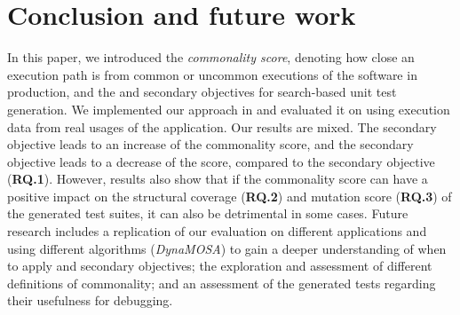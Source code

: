 

\section{Conclusion and future work}
\label{sec:cub:conclusion}

In this paper, we introduced the \emph{commonality score}, denoting how close an execution path is from common or uncommon executions of the software in production, and the \com and \ucom secondary objectives for search-based unit test generation. 
We implemented our approach in \evosuite and evaluated it on \jabref using execution data from real usages of the application. 
Our results are mixed. The \com secondary objective leads to an increase of the commonality score, and the \ucom secondary objective leads to a decrease of the score, compared to the \df secondary objective (\textbf{RQ.1}).
However, results also show that if the commonality score can have a positive impact on the structural coverage (\textbf{RQ.2}) and mutation score (\textbf{RQ.3}) of the generated test suites, it can also be detrimental in some cases. 
Future research includes a replication of our evaluation on different applications and using different algorithms (\eg \textit{DynaMOSA}) to gain a deeper understanding of when to apply \com and \ucom secondary objectives; the exploration and assessment of different definitions of commonality; and an assessment of the generated tests regarding their usefulness for debugging. 


